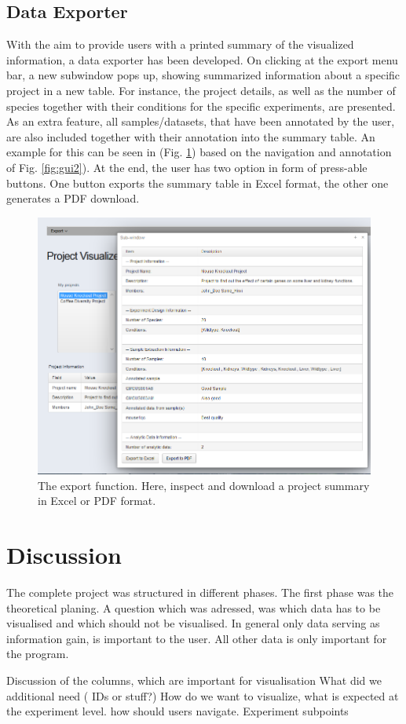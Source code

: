 \documentclass[a4paper, 11pt]{article}
\begin{document}
\subsection{Data Exporter}
With the aim to provide users with a printed summary of the visualized information, a data exporter has been developed. On clicking at the export menu bar, a new subwindow pops up, showing summarized information about a specific project in a new table. For instance, the project details, as well as the number of species together with their conditions for the specific experiments, are presented. As an extra feature, all samples/datasets, that have been annotated by the user, are also included together with their annotation into the summary table. An example for this can be seen in (Fig. \ref{fig:gui4}) based on the navigation and annotation of Fig. \ref{fig:gui2}). At the end, the user has two option in form of press-able buttons. One button exports the summary table in Excel format, the other one generates a PDF download.
\begin{figure}[H]
\centering
\includegraphics[scale=0.40]{GUI_4.png}
\caption[The export function]{The export function. Here, inspect and download a project summary in Excel or PDF format.}
\label{fig:gui4}
\end{figure}
\noindent 
\section{Discussion}
The complete project was structured in different phases. The first phase was the theoretical planing. A question which was adressed, was which data has to be visualised and which should not be visualised. In general only data serving as information gain, is important to the user. All other data is only important for the program. 



Discussion of the columns, which are important for visualisation
What did we additional need ( IDs or stuff?)
How do we want to visualize, what is expected at the experiment level. how should users navigate.
Experiment subpoints

\clearpage

\end{document}
